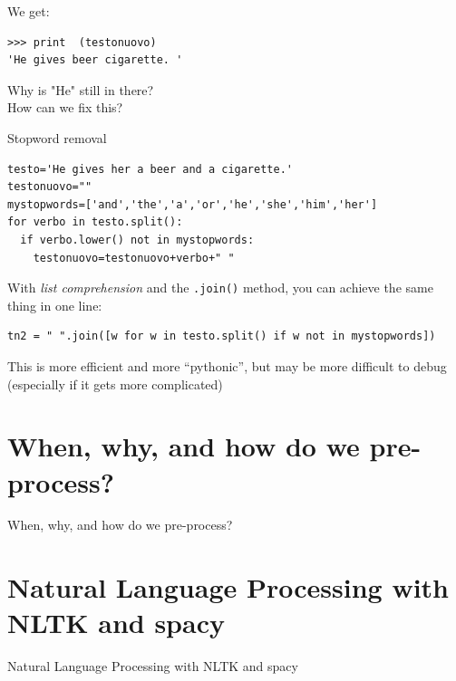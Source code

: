 \documentclass{beamer}
\begin{document}
\begin{frame}[fragile]{We get:}
\begin{lstlisting}
>>> print  (testonuovo)
'He gives beer cigarette. '
\end{lstlisting}
Why is "He" still in there? \\ How can we fix this?
\end{frame}

\begin{frame}[fragile]{Stopword removal}
\begin{lstlisting}
testo='He gives her a beer and a cigarette.'
testonuovo=""
mystopwords=['and','the','a','or','he','she','him','her']
for verbo in testo.split():
  if verbo.lower() not in mystopwords:
    testonuovo=testonuovo+verbo+" "
\end{lstlisting}

\pause

With \textit{list comprehension} and the \texttt{.join()} method, you can achieve the same thing in one line:

\begin{lstlisting}
tn2 = " ".join([w for w in testo.split() if w not in mystopwords])
\end{lstlisting}
\pause
This is more efficient and more ``pythonic'', but may be more difficult to debug (especially if it gets more complicated)

\end{frame}











\section{When, why, and how do we pre-process?}
\begin{frame}[plain]
When, why, and how do we pre-process?
\end{frame}



\section{Natural Language Processing with NLTK and spacy}
\begin{frame}[plain]
Natural Language Processing with NLTK and spacy
\end{frame}
	
\end{document}
